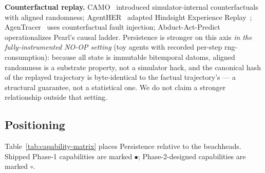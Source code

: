 \documentclass[anon]{nesy2026}   %
\begin{document}
\textbf{Counterfactual replay.}\label{sec:counterfactual-rw} CAMO~\citep{anon2026camo} introduced simulator-internal counterfactuals with aligned randomness; AgentHER~\citep{anon2026agenther} adapted Hindsight Experience Replay~\citep{andrychowicz2017her}; AgenTracer~\citep{anon2025agentracer} uses counterfactual fault injection; Abduct-Act-Predict~\citep{anon2025aap} operationalizes Pearl's causal ladder. Persistence is stronger on this axis \emph{in the fully-instrumented NO-OP setting} (toy agents with recorded per-step rng-consumption): because all state is immutable bitemporal datoms, aligned randomness is a substrate property, not a simulator hack, and the canonical hash of the replayed trajectory is byte-identical to the factual trajectory's --- a structural guarantee, not a statistical one. We do not claim a stronger relationship outside that setting.

\subsection{Positioning}\label{sec:positioning}

Table~\ref{tab:capability-matrix} places Persistence relative to the beachheads. Shipped Phase-1 capabilities are marked $\bullet$; Phase-2-designed capabilities are marked $\circ$.
\end{document}
